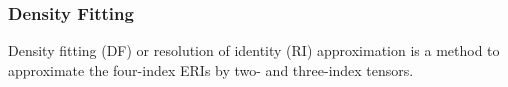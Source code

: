 \documentclass{article}
\begin{document}
        
        \subsubsection{Density Fitting}
            Density fitting (DF) or resolution of identity (RI) approximation is a method to approximate the four-index ERIs by two- and three-index tensors.


            
\end{document}
